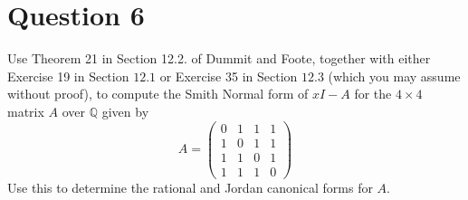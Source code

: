 \section{Question 6}

\begin{question}
    Use Theorem 21 in Section 12.2. of Dummit and Foote, together with either Exercise 19 in Section $12.1$ or Exercise 35 in Section $12.3$ (which you may assume without proof), to compute the Smith Normal form of $x I-A$ for the $4 \times 4$ matrix $A$ over $\mathbb{Q}$ given by
    $$
    A=\left(\begin{array}{llll}
    0 & 1 & 1 & 1 \\
    1 & 0 & 1 & 1 \\
    1 & 1 & 0 & 1 \\
    1 & 1 & 1 & 0
    \end{array}\right)
    $$
    Use this to determine the rational and Jordan canonical forms for $A$.
\end{question}


